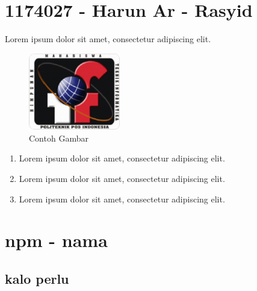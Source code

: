 \section{1174027 - Harun Ar - Rasyid}
Lorem ipsum dolor sit amet, consectetur adipiscing elit.


\hfill\break
\begin{figure}[H]
    \includegraphics[width=4cm]{figures/kelompok3/1/himatif.png}
    \centering
    \caption{Contoh Gambar}
\end{figure}

\begin{enumerate}
	\item Lorem ipsum dolor sit amet, consectetur adipiscing elit.
	\item Lorem ipsum dolor sit amet, consectetur adipiscing elit.
	\item Lorem ipsum dolor sit amet, consectetur adipiscing elit.
\end{enumerate}




\section{npm - nama}
\subsection{kalo perlu}